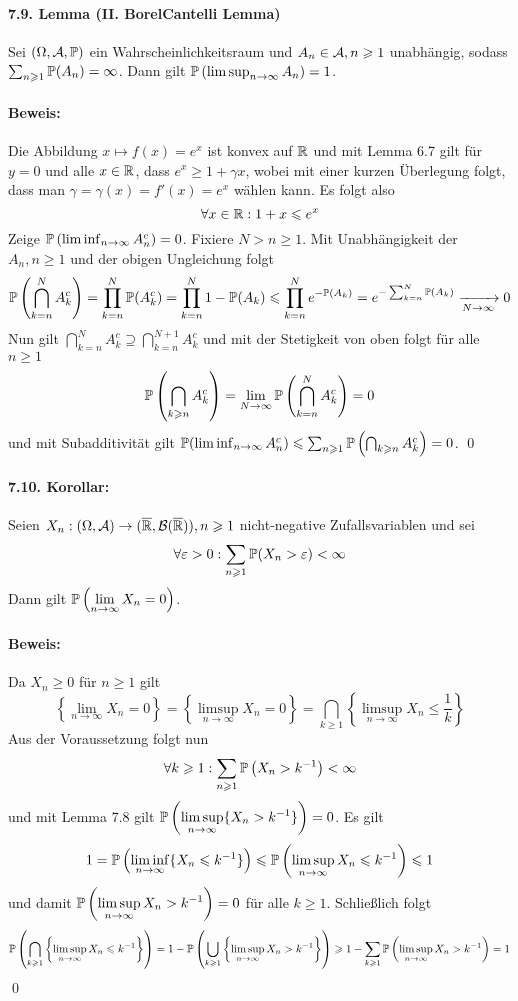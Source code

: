 \paragraph{7.9. Lemma (II. Borel\textendash Cantelli Lemma)}Sei  $(\Omega, \mathcal{A}, \mathbb{P})$ ein Wahrscheinlichkeitsraum und $A_n\in\mathcal{A},n\geqslant1$ unabh\"angig, sodass $\sum_{n\geqslant1}\mathbb{P}(A_n)=\infty$. Dann gilt $\mathbb{P}\left(\limsup_{n\to\infty}A_n\right)=1$. 

\paragraph{Beweis:}Die Abbildung $x\mapsto f(x)=e^x$ ist konvex auf $\mathbb{R}$ und mit Lemma 6.7 gilt f\"ur $y=0$ und alle $x\in\mathbb{R}$, dass
$e^x\geq1+\gamma x$, wobei mit einer kurzen \"Uberlegung folgt, dass man $\gamma=\gamma(x)=f'(x)=e^x$ w\"ahlen kann. Es folgt also
$$\forall x\in\mathbb{R}:1+x\leqslant e^x$$
Zeige $\mathbb{P}\left(\liminf_{n\to\infty}A_n^c\right)=0$. Fixiere $N>n\geq1$. Mit Unabh\"angigkeit der $A_n,n\geq1$ und der obigen Ungleichung folgt
    $$\Pp\left(\bigcap_{k=n}^NA_k^c\right)=\prod_{k=n}^N\Pp(A_k^c)=\prod_{k=n}^N1-\Pp(A_k)\leq \prod_{k=n}^Ne^{-\Pp(A_k)}=e^{-\sum_{k=n}^N\Pp(A_k)}\nto{}{N\to\infty}0$$
    Nun  gilt $\bigcap_{k=n}^NA_k^c\supseteq \bigcap_{k=n}^{N+1}A_k^c$ und mit der Stetigkeit von oben folgt f\"ur alle $n\geq1$
    $$\mathbb{P}\left(\bigcap_{k\geqslant n}A_k^c\right)=\lim_{N\to\infty}\mathbb{P}\left(\bigcap_{k=n}^NA_k^c\right)=0$$
    und mit Subadditivit\"at gilt $\mathbb{P}(\liminf_{n\to\infty}A_n^c)\leqslant\sum_{n\geqslant1}\mathbb{P}\left(\bigcap_{k\geqslant n}A_k^c\right)=0$.
\qed

\paragraph{7.10. Korollar:}Seien $X_n:(\Omega,\mathcal{A})\to(\overline{\mathbb{R}},\mathcal{B}(\overline{\mathbb{R}})),n\geqslant1$ nicht-negative Zufallsvariablen und sei 
$$\forall\varepsilon>0:\sum_{n\geqslant1}\mathbb{P}(X_n>\varepsilon)<\infty$$
Dann gilt $\displaystyle\mathbb{P}\left(\lim_{n\to\infty}X_n=0\right)$.

\paragraph{Beweis:}Da $X_n\geq0$ f\"ur $n\geq1$ gilt
$$\left\{\lim_{n\to\infty}X_n=0\right\}=\left\{\limsup_{n\to\infty}X_n=0\right\}=\bigcap_{k\geq1}\left\{\limsup_{n\to\infty}X_n\leq\frac{1}{k}\right\}$$
Aus der Voraussetzung folgt nun 
$$\forall k\geqslant1:\sum_{n\geqslant1}\mathbb{P}\left(X_n> k^{-1}\right)<\infty$$
und mit Lemma 7.8 gilt $\displaystyle\mathbb{P}\left(\limsup_{n\to\infty}\{X_n>k^{-1}\}\right)=0$. Es gilt
\begin{align*}
    1=\mathbb{P}\left(\liminf_{n\to\infty}\{X_n\leqslant k^{-1}\}\right)\leqslant\mathbb{P}\left(\limsup_{n\to\infty}X_n\leqslant k^{-1}\right)\leqslant1
\end{align*}
und damit $\displaystyle\mathbb{P}\left(\limsup_{n\to\infty}X_n>k^{-1}\right)=0$ f\"ur alle $k\geq1$. Schlie\ss{}lich folgt
$$\mathbb{P}\left(\bigcap_{k\geqslant1}\left\{\limsup_{n\to\infty}X_n\leqslant k^{-1}\right\}\right)=1-\mathbb{P}\left(\bigcup_{k\geqslant1}\left\{\limsup_{n\to\infty}X_n> k^{-1}\right\}\right)\geqslant 1-\sum_{k\geqslant1}\mathbb{P}\left(\limsup_{n\to\infty}X_n> k^{-1}\right)=1$$
\qed

